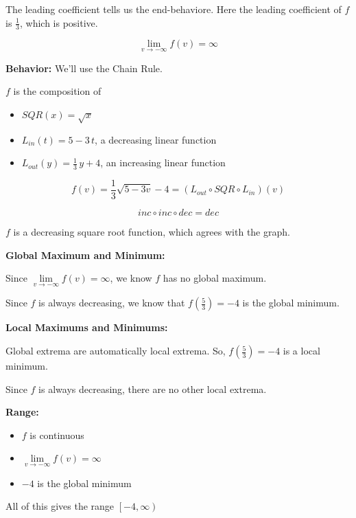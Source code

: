 \documentclass{ximera}
\begin{document}
\begin{example}
The leading coefficient tells us the end-behaviore. Here the leading coefficient of $f$ is $\frac{1}{3}$, which is positive.


\[  \lim\limits_{v \to -\infty} f(v) = \infty   \]







\textbf{Behavior:}  We'll use the Chain Rule.

$f$ is the composition of

\begin{itemize}
\item $SQR(x) = \sqrt{x}$ 

\item $L_{in}(t) = 5 - 3 \, t$, a decreasing linear function

\item $L_{out}(y) = \frac{1}{3} \, y + 4$, an increasing linear function
\end{itemize}


\[  f(v) =  \frac{1}{3} \sqrt{5-3v}-4 = (L_{out} \circ SQR \circ L_{in})(v) \]

\[ inc \circ inc \circ dec = dec  \]


$f$ is a decreasing square root function, which agrees with the graph.



\textbf{Global Maximum and Minimum:} 


Since $\lim\limits_{v \to -\infty} f(v) = \infty$, we know $f$ has no global maximum.

Since $f$ is always decreasing, we know that $f\left( \frac{5}{3} \right) = -4$ is the global minimum.


\textbf{Local Maximums and Minimums:} 

Global extrema are automatically local extrema.  So, $f\left( \frac{5}{3} \right) = -4$ is a local minimum.

Since $f$ is always decreasing, there are no other local extrema.


\textbf{Range:} 

\begin{itemize}
\item $f$ is continuous
\item $\lim\limits_{v \to -\infty} f(v) = \infty$
\item $-4$ is the global minimum
\end{itemize}

All of this gives the range  $\left[ -4, \infty \right)$



\end{example}
\end{document}
